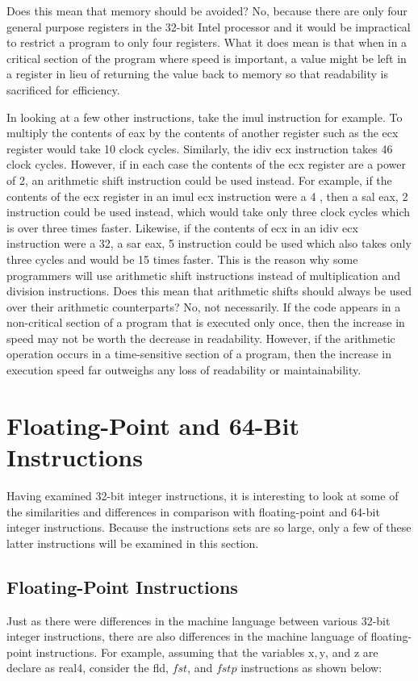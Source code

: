 \documentclass[10pt]{book}
\begin{document}
Does this mean that memory should be avoided? No, because there are only four general purpose registers in the 32-bit Intel processor and it would be impractical to restrict a program to only four registers. What it does mean is that when in a critical section of the program where speed is important, a value might be left in a register in lieu of returning the value back to memory so that readability is sacrificed for efficiency.

In looking at a few other instructions, take the imul instruction for example. To multiply the contents of eax by the contents of another register such as the ecx register would take 10 clock cycles. Similarly, the idiv ecx instruction takes 46 clock cycles. However, if in each case the contents of the ecx register are a power of 2, an arithmetic shift instruction could be used instead. For example, if the contents of the ecx register in an imul ecx instruction were a 4 , then a sal eax, 2 instruction could be used instead, which would take only three clock cycles which is over three times faster. Likewise, if the contents of ecx in an idiv ecx instruction were a 32, a sar eax, 5 instruction could be used which also takes only three cycles and would be 15 times faster. This is the reason why some programmers will use arithmetic shift instructions instead of multiplication and division instructions. Does this mean that arithmetic shifts should always be used over their arithmetic counterparts? No, not necessarily. If the code appears in a non-critical section of a program that is executed only once, then the increase in speed may not be worth the decrease in readability. However, if the arithmetic operation occurs in a time-sensitive section of a program, then the increase in execution speed far outweighs any loss of readability or maintainability.

\section{Floating-Point and 64-Bit Instructions}
Having examined 32-bit integer instructions, it is interesting to look at some of the similarities and differences in comparison with floating-point and 64-bit integer instructions. Because the instructions sets are so large, only a few of these latter instructions will be examined in this section.

\subsection{Floating-Point Instructions}
Just as there were differences in the machine language between various 32-bit integer instructions, there are also differences in the machine language of floating-point instructions. For example, assuming that the variables $\mathrm{x}, \mathrm{y}$, and z are declare as real4, consider the fld, $f s t$, and $f s t p$ instructions as shown below:
\end{document}
